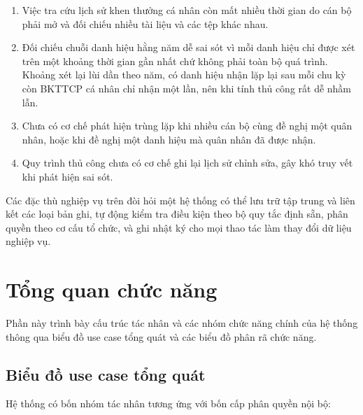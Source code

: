 \documentclass[../DoAn.tex]{subfiles}
\begin{document}
\begin{enumerate}
    \item Việc tra cứu lịch sử khen thưởng cá nhân còn mất nhiều thời gian do cán bộ phải mở và đối chiếu nhiều tài liệu và các tệp khác nhau.
    \item Đối chiếu chuỗi danh hiệu hằng năm dễ sai sót vì mỗi danh hiệu chỉ được xét trên một khoảng thời gian gần nhất chứ không phải toàn bộ quá trình. Khoảng xét lại lùi dần theo năm, có danh hiệu nhận lặp lại sau mỗi chu kỳ còn BKTTCP cá nhân chỉ nhận một lần, nên khi tính thủ công rất dễ nhầm lẫn.
    \item Chưa có cơ chế phát hiện trùng lặp khi nhiều cán bộ cùng đề nghị một quân nhân, hoặc khi đề nghị một danh hiệu mà quân nhân đã được nhận.
    \item Quy trình thủ công chưa có cơ chế ghi lại lịch sử chỉnh sửa, gây khó truy vết khi phát hiện sai sót.
\end{enumerate}

Các đặc thù nghiệp vụ trên đòi hỏi một hệ thống có thể lưu trữ tập trung và liên kết các loại bản ghi, tự động kiểm tra điều kiện theo bộ quy tắc định sẵn, phân quyền theo cơ cấu tổ chức, và ghi nhật ký cho mọi thao tác làm thay đổi dữ liệu nghiệp vụ.

\section{Tổng quan chức năng}
\label{section:2.2}

Phần này trình bày cấu trúc tác nhân và các nhóm chức năng chính của hệ thống thông qua biểu đồ use case tổng quát và các biểu đồ phân rã chức năng.

\subsection{Biểu đồ use case tổng quát}
\label{subsection:2.2.1}

Hệ thống có bốn nhóm tác nhân tương ứng với bốn cấp phân quyền nội bộ:
\end{document}
